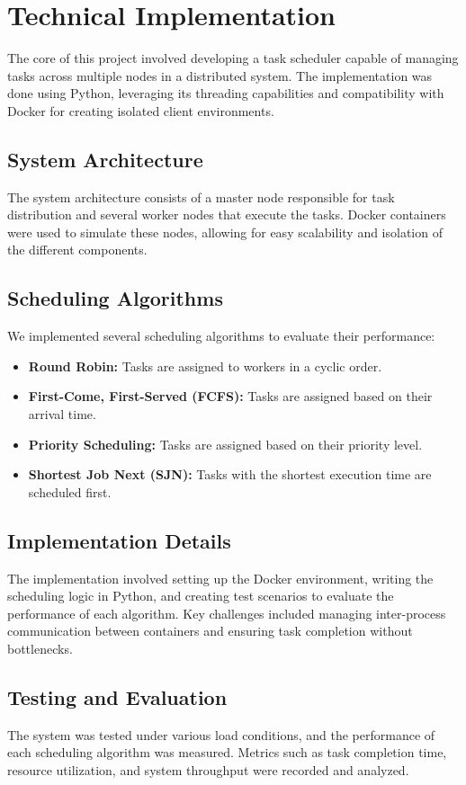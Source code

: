 \documentclass{article}
\begin{document}
\section{Technical Implementation}
The core of this project involved developing a task scheduler capable of managing tasks across multiple nodes in a distributed system. The implementation was done using Python, leveraging its threading capabilities and compatibility with Docker for creating isolated client environments.

\subsection{System Architecture}
The system architecture consists of a master node responsible for task distribution and several worker nodes that execute the tasks. Docker containers were used to simulate these nodes, allowing for easy scalability and isolation of the different components.

\subsection{Scheduling Algorithms}
We implemented several scheduling algorithms to evaluate their performance:
\begin{itemize}
    \item \textbf{Round Robin:} Tasks are assigned to workers in a cyclic order.
    \item \textbf{First-Come, First-Served (FCFS):} Tasks are assigned based on their arrival time.
    \item \textbf{Priority Scheduling:} Tasks are assigned based on their priority level.
    \item \textbf{Shortest Job Next (SJN):} Tasks with the shortest execution time are scheduled first.
\end{itemize}

\subsection{Implementation Details}
The implementation involved setting up the Docker environment, writing the scheduling logic in Python, and creating test scenarios to evaluate the performance of each algorithm. Key challenges included managing inter-process communication between containers and ensuring task completion without bottlenecks.

\subsection{Testing and Evaluation}
The system was tested under various load conditions, and the performance of each scheduling algorithm was measured. Metrics such as task completion time, resource utilization, and system throughput were recorded and analyzed.
\end{document}

